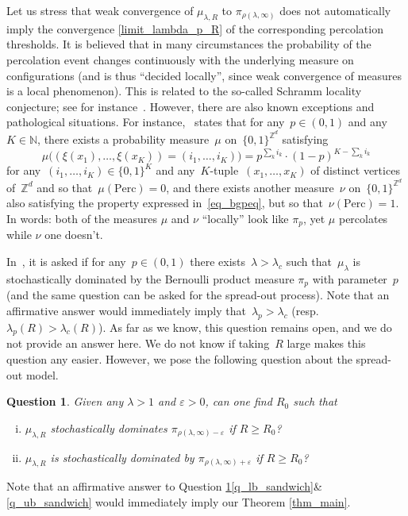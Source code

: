 \documentclass[a4paper,12pt]{article}
\newtheorem  {question}        [theorem]{Question}
\newcommand{\Z}{\mathbb{Z}}
\begin{document}
\smallskip



Let us stress that weak convergence of $\mu_{\lambda,R}$ to $\pi_{\rho(\lambda, \infty)}$ does not automatically imply the convergence \eqref{limit_lambda_p_R} of the corresponding percolation thresholds.
It is believed that in many  circumstances the probability of the percolation event changes continuously with the underlying measure on configurations (and is thus ``decided locally'', since weak convergence of measures is a local phenomenon). This is related to the so-called Schramm locality conjecture; see for instance~\cite{bnp11, MT17,sxz14}. However, there are also known exceptions and pathological situations. For instance,~\cite[Theorem~19]{bgp12} states that for any~$p \in (0,1)$ and any~$K \in \mathbb{N}$, there exists a probability measure~$\mu$ on~$\{0,1\}^{\Z^d}$ satisfying
\begin{equation}\label{eq_bgpeq}
	\mu\big( (\xi(x_1),\ldots, \xi(x_K)) = (i_1,\ldots,i_K)\big) = p^{\sum_k i_k}\cdot (1-p)^{K-\sum_k i_k}
\end{equation}
for any~$(i_1,\ldots,i_K)\in \{0,1\}^K$ and any~$K$-tuple~$(x_1,\ldots,x_K)$ of distinct vertices of~$\Z^d$ and so that~$\mu(\text{Perc}) = 0$, and there exists another measure~$\nu$ on~$\{0,1\}^{\Z^d}$ also satisfying the property expressed in~\eqref{eq_bgpeq}, but so that~$\nu(\text{Perc}) = 1$. In words: both of the measures $\mu$ and $\nu$  ``locally'' look like  $\pi_p$, yet $\mu$ percolates while $\nu$ one doesn't.


\smallskip


In~\cite[Section 6, Question~1]{LS06}, it is asked if for any~$p \in (0,1)$ there exists~$\lambda > \lambda_c$ such that~$\mu_\lambda$ is stochastically dominated by the Bernoulli product measure $\pi_p$ with parameter~$p$ (and the same question can be asked for the spread-out process). Note that an affirmative answer would immediately imply that~$\lambda_p > \lambda_c$ (resp.\ $\lambda_p(R)> \lambda_c(R)$). As far as we know, this question remains open, and we do not provide an answer here. We do not know if taking~$R$ large makes this question any easier. However, we pose the following question about the spread-out model.
\begin{question}\label{question_sandwich}
 Given any $\lambda>1$ and $\varepsilon>0$, can one find $R_0$ such that
\begin{enumerate}[(i)]
\item\label{q_lb_sandwich}
 $\mu_{\lambda,R}$ stochastically dominates  $\pi_{\rho(\lambda,\infty)-\varepsilon}$ if $R \geq R_0$?
 \item\label{q_ub_sandwich} $\mu_{\lambda,R}$ is stochastically dominated by $\pi_{\rho(\lambda,\infty)+\varepsilon}$ if $R \geq R_0$?
\end{enumerate}
\end{question}
Note that an affirmative answer to Question \ref{question_sandwich}\eqref{q_lb_sandwich}\&\eqref{q_ub_sandwich}  would immediately imply our Theorem \ref{thm_main}.
\end{document}
